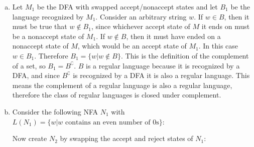 \documentclass[10pt, legalpaper]{exam}
\begin{document}
\begin{questions}
\begin{enumerate}[(a)]
    \item Let \(M_{1}\) be the DFA with swapped accept/nonaccept states and let \(B_{1}\) be the language recognized by \(M_{1}\). Consider an arbitrary string \(w\). If \(w \in B\), then it must be true that \(w \notin B_{1}\), since whichever accept state of \(M\) it ends on must be a nonaccept state of \(M_{1}\). If \(w \notin B\), then it must have ended on a nonaccept state of \(M\), which would be an accept state of \(M_{1}\). In this case \(w \in B_{1}\). Therefore \(B_{1}=\{w|w \notin B\}\). This is the definition of the complement of a set, so \(B_{1}=B^{\complement}\). \(B\) is a regular language because it is recognized by a DFA, and since \(B^{\complement}\) is recognized by a DFA it is also a regular language. This means the complement of a regular language is also a regular language, therefore the class of regular languages is closed under complement.

    \item Consider the following NFA \(N_{1}\) with \(L(N_{1})=\{w| w \textrm{ contains an even number of 0s}\}\): 
    \begin{center}       
    \end{center}
    
    Now create \(N_{2}\) by swapping the accept and reject states of \(N_{1}\):
    \begin{center}       
    \begin{tikzpicture}[->,
            >=latex,
            auto,
            node distance=2.5cm,
            semithick,
            baseline=(top.base)]


\end{tikzpicture}
\end{center}
\end{enumerate}
\end{questions}
\end{document}
